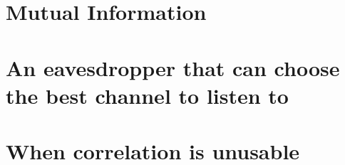\section{Mutual Information}
    \lipsum[2]
\section{An eavesdropper that can choose the best channel to listen to}
    \lipsum[3]
\section{When correlation is unusable}
    \lipsum[1]
